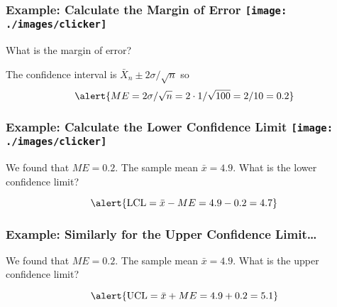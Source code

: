 \begin{frame}
\frametitle{Example: Calculate the Margin of Error \hfill \texttt{[image: ./images/clicker]}}
\begin{center}
\end{center}
What is the margin of error?
\pause

\vspace{2em}

The confidence interval is $\bar{X}_n \pm 2\sigma/\sqrt{n}$ so 
	$$\alert{ME = 2\sigma/\sqrt{n} = 2 \cdot 1/\sqrt{100} = 2/10 = 0.2}$$

\end{frame}
\begin{frame}
\frametitle{Example: Calculate the Lower Confidence Limit \hfill \texttt{[image: ./images/clicker]}}


\begin{center}
\end{center}

We found that $ME=0.2$. The sample mean $\bar{x} = 4.9$. What is the lower confidence limit?
\pause

\vspace{2em}

	$$\alert{\mbox{LCL} = \bar{x} - ME= 4.9 - 0.2 = 4.7}$$

\end{frame}
\begin{frame}
  \frametitle{Example: Similarly for the Upper Confidence Limit\dots}


\begin{center}
\end{center}

We found that $ME=0.2$. The sample mean $\bar{x} = 4.9$. What is the upper confidence limit?
\pause

\vspace{2em}

	$$\alert{\mbox{UCL} = \bar{x} + ME= 4.9 + 0.2 = 5.1}$$

\end{frame}
